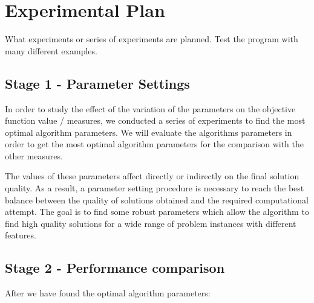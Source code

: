 \section{Experimental Plan}

What experiments or series of experiments are planned. Test the program with many different examples. 

\subsection{Stage 1 - Parameter Settings}

In order to study the effect of the variation of the parameters on the objective function value / measures, we conducted a series of experiments to find the most optimal algorithm parameters. We will evaluate the algorithms parameters in order to get the most optimal algorithm parameters for the comparison with the other measures. 

The values of these parameters affect directly or indirectly on the final solution quality. As a result, a parameter setting procedure is necessary to reach the best balance between the quality of solutions obtained and the required computational attempt. The goal is to find some robust parameters which allow the algorithm to find high quality solutions for a wide range of problem instances with different features. 

\subsection{Stage 2 - Performance comparison}

After we have found the optimal algorithm parameters:

